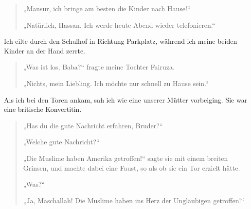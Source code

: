 \documentclass[12pt]{memoir}
\begin{document}
\begin{quote}
„Mansur, ich bringe am besten die Kinder nach Hause!“

„Natürlich, Hassan. Ich werde heute Abend wieder telefonieren.“
\end{quote}

Ich eilte durch den Schulhof in Richtung Parkplatz,
während ich meine beiden Kinder an der Hand zerrte.

\begin{quote}
„Was ist los, Baba?“ fragte meine Tochter Fairuza.

„Nichts, mein Liebling.
Ich möchte nur schnell zu Hause sein.“
\end{quote}

Als ich bei den Toren ankam, sah ich wie eine unserer Mütter vorbeiging.
Sie war eine britische Konvertitin.

\begin{quote}
„Has du die gute Nachricht erfahren, Bruder?“

„Welche gute Nachricht?“

„Die Muslime haben Amerika getroffen!“ sagte sie mit einem breiten Grinsen,
und machte dabei eine Faust, so als ob sie ein Tor erzielt hätte.

„Was?“

„Ja, Maschallah!
Die Muslime haben ins Herz der Ungläubigen getroffen!“
\end{quote}
\end{document}
